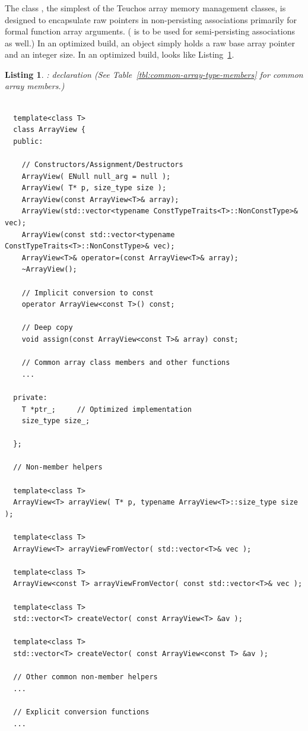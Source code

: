 \documentclass[pdf,ps2pdf,11pt]{SANDreport}
\newtheorem{listing}{Listing}
\begin{document}
%
{}\subsubsection{}
\label{sec:ArrayView}
%

The class {}, the simplest of the Teuchos array memory
management classes, is designed to encapsulate raw pointers in
non-persisting associations primarily for formal function array
arguments.  ({} is to be used for semi-persisting
associations as well.)  In an optimized build, an {}
object simply holds a raw base array pointer and an integer size.  In
an optimized build, {} looks like
Listing~\ref{listing:ArrayView}.

{}\begin{listing}: {} declaration (See
Table~\ref{tbl:common-array-type-members} for common array members.)
\label{listing:ArrayView}
{\small\begin{verbatim}

  template<class T>
  class ArrayView {
  public:

    // Constructors/Assignment/Destructors
    ArrayView( ENull null_arg = null );
    ArrayView( T* p, size_type size );
    ArrayView(const ArrayView<T>& array);
    ArrayView(std::vector<typename ConstTypeTraits<T>::NonConstType>& vec);
    ArrayView(const std::vector<typename ConstTypeTraits<T>::NonConstType>& vec);
    ArrayView<T>& operator=(const ArrayView<T>& array);
    ~ArrayView();

    // Implicit conversion to const
    operator ArrayView<const T>() const;

    // Deep copy  
    void assign(const ArrayView<const T>& array) const;

    // Common array class members and other functions
    ...

  private:
    T *ptr_;     // Optimized implementation
    size_type size_;

  };

  // Non-member helpers

  template<class T>
  ArrayView<T> arrayView( T* p, typename ArrayView<T>::size_type size );

  template<class T>
  ArrayView<T> arrayViewFromVector( std::vector<T>& vec );

  template<class T>
  ArrayView<const T> arrayViewFromVector( const std::vector<T>& vec );

  template<class T>
  std::vector<T> createVector( const ArrayView<T> &av );

  template<class T>
  std::vector<T> createVector( const ArrayView<const T> &av );

  // Other common non-member helpers
  ...

  // Explicit conversion functions
  ...

\end{verbatim}}
\end{listing}
\end{document}
